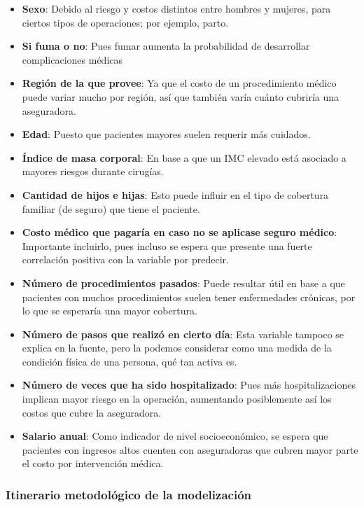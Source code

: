 \documentclass[
]{article}
\providecommand{\tightlist}{%
  \setlength{\itemsep}{0pt}\setlength{\parskip}{0pt}}\usepackage{longtable,booktabs,array}
\begin{document}
\begin{itemize}
\tightlist
\item
  \textbf{Sexo}: Debido al riesgo y costos distintos entre hombres y
  mujeres, para ciertos tipos de operaciones; por ejemplo, parto.
\item
  \textbf{Si fuma o no}: Pues fumar aumenta la probabilidad de
  desarrollar complicaciones médicas
\item
  \textbf{Región de la que provee}: Ya que el costo de un procedimiento
  médico puede variar mucho por región, así que también varía cuánto
  cubriría una aseguradora.
\item
  \textbf{Edad}: Puesto que pacientes mayores suelen requerir más
  cuidados.
\item
  \textbf{Índice de masa corporal}: En base a que un IMC elevado está
  asociado a mayores riesgos durante cirugías.
\item
  \textbf{Cantidad de hijos e hijas}: Esto puede influir en el tipo de
  cobertura familiar (de seguro) que tiene el paciente.
\item
  \textbf{Costo médico que pagaría en caso no se aplicase seguro
  médico}: Importante incluirlo, pues incluso se espera que presente una
  fuerte correlación positiva con la variable por predecir.
\item
  \textbf{Número de procedimientos pasados}: Puede resultar útil en base
  a que pacientes con muchos procedimientos suelen tener enfermedades
  crónicas, por lo que se esperaría una mayor cobertura.
\item
  \textbf{Número de pasos que realizó en cierto día}: Esta variable
  tampoco se explica en la fuente, pero la podemos considerar como una
  medida de la condición física de una persona, qué tan activa es.
\item
  \textbf{Número de veces que ha sido hospitalizado}: Pues más
  hospitalizaciones implican mayor riesgo en la operación, aumentando
  posiblemente así los costos que cubre la aseguradora.
\item
  \textbf{Salario anual}: Como indicador de nivel socioeconómico, se
  espera que pacientes con ingresos altos cuenten con aseguradoras que
  cubren mayor parte el costo por intervención médica.
\end{itemize}

\subsubsection{Itinerario metodológico de la
modelización}\label{itinerario-metodoluxf3gico-de-la-modelizaciuxf3n}
\end{document}
